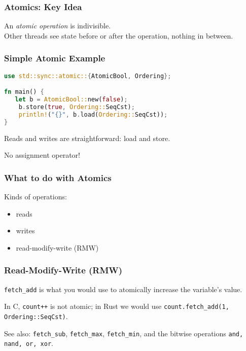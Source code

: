 \begin{frame}[fragile]
  \frametitle{Atomics: Key Idea}
  
    An \emph{atomic operation} is indivisible.\\[1em]
    Other threads see state before or after the operation,
    nothing in between.
  
\end{frame}


\begin{frame}[fragile]
\frametitle{Simple Atomic Example}

\begin{lstlisting}[language=Rust]
use std::sync::atomic::{AtomicBool, Ordering};

fn main() {
   let b = AtomicBool::new(false);
    b.store(true, Ordering::SeqCst);
    println!("{}", b.load(Ordering::SeqCst));
}
\end{lstlisting}

  Reads and writes are straightforward: load and store.

No assignment operator!

\end{frame}


\begin{frame}
  \frametitle{What to do with Atomics}

  

    \Large
    Kinds of operations:
    \begin{itemize}
    \item reads
    \item writes
    \item read-modify-write (RMW)
    \end{itemize}
    
\end{frame}

\begin{frame}
  \frametitle{Read-Modify-Write (RMW)}

  \texttt{fetch\_add} is what you would use to atomically increase the variable's value. 
  
  In C, \texttt{count++} is not atomic; in Rust we would use \texttt{count.fetch\_add(1, Ordering::SeqCst)}.

See also: \texttt{fetch\_sub}, \texttt{fetch\_max}, \texttt{fetch\_min}, and the bitwise operations \texttt{and, nand, or, xor}.
  
\end{frame}


